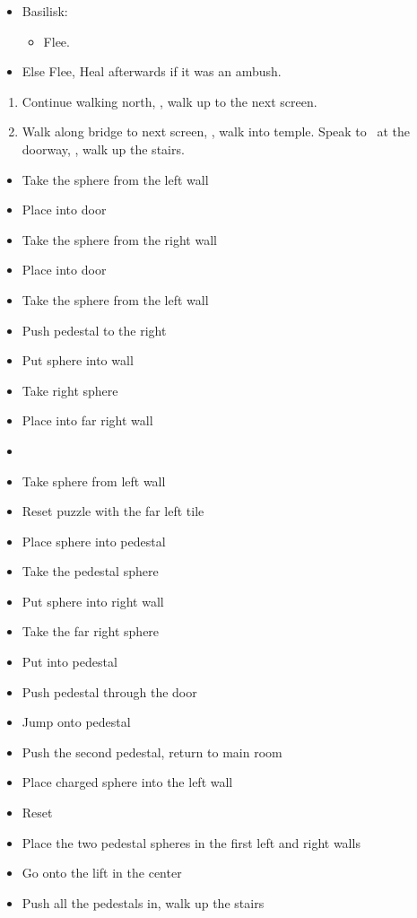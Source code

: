 \begin{encounters}
  \begin{itemize}
    \item Basilisk:
          \begin{itemize}
            \kimahrif Lancet Basilisk, learn \textbf{Stone Breath}
            \item Flee.
          \end{itemize}
    \item Else Flee,  Heal afterwards if it was an ambush.
  \end{itemize}
\end{encounters}
\begin{enumerate}[resume]
  \item Continue walking north, \sd, walk up to the next screen.
  \item Walk along bridge to next screen, \sd, walk into temple. Speak to \auron\ at the doorway, \sd, walk up the stairs.
\end{enumerate}
\vfill
\begin{trial}
  \begin{itemize}
    \item Take the sphere from the left wall
    \item Place into door
    \item Take the sphere from the right wall
    \item Place into door
    \item Take the sphere from the left wall
    \item Push pedestal to the right
    \item Put sphere into wall
    \item Take right sphere
    \item Place into far right wall
    \item \cs
    \item Take sphere from left wall
    \item Reset puzzle with the far left tile
    \item Place sphere into pedestal
    \item Take the pedestal sphere
    \item Put sphere into right wall
    \item Take the far right sphere
    \item Put into pedestal
    \item Push pedestal through the door
    \item Jump onto pedestal
    \item Push the second pedestal, return to main room
    \item Place charged sphere into the left wall
    \item Reset
    \item Place the two pedestal spheres in the first left and right walls
    \item Go onto the lift in the center
    \item Push all the pedestals in, walk up the stairs
  \end{itemize}
\end{trial}
